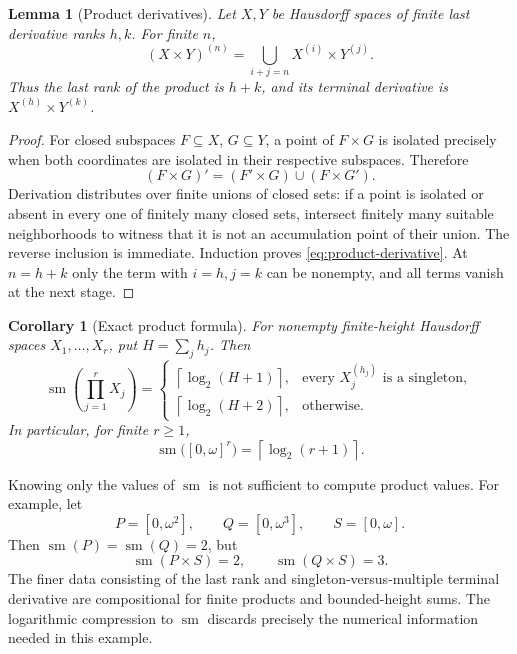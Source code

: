 \documentclass[11pt,letterpaper]{article}
\numberwithin{equation}{section}
\newtheorem{lemma}[lemma]{Lemma}
\newtheorem{corollary}[corollary]{Corollary}
\theoremstyle{definition}
\theoremstyle{remark}
\newcommand{\sm}{\operatorname{sm}}
\newcommand{\ceil}[1]{\left\lceil#1\right\rceil}
\begin{document}
\begin{lemma}[Product derivatives]\label{lem:product}
Let $X,Y$ be Hausdorff spaces of finite last derivative ranks $h,k$.
For finite $n$,
\begin{equation}\label{eq:product-derivative}
 (X\times Y)^{(n)}=
 \bigcup_{i+j=n}X^{(i)}\times Y^{(j)}.
\end{equation}
Thus the last rank of the product is $h+k$, and its terminal derivative is
$X^{(h)}\times Y^{(k)}$.
\end{lemma}
\begin{proof}
For closed subspaces $F\subseteq X$, $G\subseteq Y$, a point of $F\times G$
is isolated precisely when both coordinates are isolated in their respective
subspaces. Therefore
\[
 (F\times G)'=(F'\times G)\cup(F\times G').
\]
Derivation distributes over finite unions of closed sets: if a point is
isolated or absent in every one of finitely many closed sets, intersect finitely
many suitable neighborhoods to witness that it is not an accumulation point
of their union. The reverse inclusion is immediate. Induction proves
\eqref{eq:product-derivative}. At $n=h+k$ only the term with $i=h,j=k$ can be
nonempty, and all terms vanish at the next stage.
\end{proof}

\begin{corollary}[Exact product formula]\label{cor:product}
For nonempty finite-height Hausdorff spaces $X_1,\ldots,X_r$, put
$H=\sum_j h_j$. Then
\[
 \sm\!\left(\prod_{j=1}^rX_j\right)=
 \begin{cases}
 \ceil{\log_2(H+1)},&\text{every }X_j^{(h_j)}\text{ is a singleton},\\
 \ceil{\log_2(H+2)},&\text{otherwise}.
 \end{cases}
\]
In particular, for finite $r\geq1$,
\begin{equation}\label{eq:power}
 \sm\bigl([0,\omega]^r\bigr)=\ceil{\log_2(r+1)}.
\end{equation}
\end{corollary}

Knowing only the values of $\sm$ is not sufficient to compute product values.
For example, let
\[
 P=[0,\omega^2],\qquad Q=[0,\omega^3],\qquad S=[0,\omega].
\]
Then $\sm(P)=\sm(Q)=2$, but
\[
 \sm(P\times S)=2,\qquad \sm(Q\times S)=3.
\]
The finer data consisting of the last rank and singleton-versus-multiple
terminal derivative are compositional for finite products and bounded-height
sums. The logarithmic compression to $\sm$ discards precisely the numerical
information needed in this example.
\end{document}
